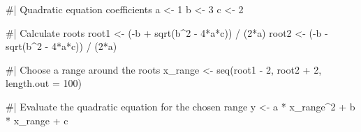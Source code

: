 \documentclass[
  letterpaper,
  DIV=11,
  numbers=noendperiod]{scrartcl}
\newenvironment{Shaded}{\begin{snugshade}}{\end{snugshade}}
\newcommand{\AttributeTok}[1]{\textcolor[rgb]{0.40,0.45,0.13}{#1}}
\newcommand{\CommentTok}[1]{\textcolor[rgb]{0.37,0.37,0.37}{#1}}
\newcommand{\DecValTok}[1]{\textcolor[rgb]{0.68,0.00,0.00}{#1}}
\newcommand{\FunctionTok}[1]{\textcolor[rgb]{0.28,0.35,0.67}{#1}}
\newcommand{\NormalTok}[1]{\textcolor[rgb]{0.00,0.23,0.31}{#1}}
\newcommand{\OtherTok}[1]{\textcolor[rgb]{0.00,0.23,0.31}{#1}}
\newcommand{\SpecialCharTok}[1]{\textcolor[rgb]{0.37,0.37,0.37}{#1}}
\begin{document}
\begin{Shaded}
\begin{Highlighting}[]
\CommentTok{\#| Quadratic equation coefficients}
\NormalTok{a }\OtherTok{\textless{}{-}} \DecValTok{1}
\NormalTok{b }\OtherTok{\textless{}{-}} \DecValTok{3}
\NormalTok{c }\OtherTok{\textless{}{-}} \DecValTok{2}

\CommentTok{\#| Calculate roots}
\NormalTok{root1 }\OtherTok{\textless{}{-}}\NormalTok{ (}\SpecialCharTok{{-}}\NormalTok{b }\SpecialCharTok{+} \FunctionTok{sqrt}\NormalTok{(b}\SpecialCharTok{\^{}}\DecValTok{2} \SpecialCharTok{{-}} \DecValTok{4}\SpecialCharTok{*}\NormalTok{a}\SpecialCharTok{*}\NormalTok{c)) }\SpecialCharTok{/}\NormalTok{ (}\DecValTok{2}\SpecialCharTok{*}\NormalTok{a)}
\NormalTok{root2 }\OtherTok{\textless{}{-}}\NormalTok{ (}\SpecialCharTok{{-}}\NormalTok{b }\SpecialCharTok{{-}} \FunctionTok{sqrt}\NormalTok{(b}\SpecialCharTok{\^{}}\DecValTok{2} \SpecialCharTok{{-}} \DecValTok{4}\SpecialCharTok{*}\NormalTok{a}\SpecialCharTok{*}\NormalTok{c)) }\SpecialCharTok{/}\NormalTok{ (}\DecValTok{2}\SpecialCharTok{*}\NormalTok{a)}

\CommentTok{\#| Choose a range around the roots}
\NormalTok{x\_range }\OtherTok{\textless{}{-}} \FunctionTok{seq}\NormalTok{(root1 }\SpecialCharTok{{-}} \DecValTok{2}\NormalTok{, root2 }\SpecialCharTok{+} \DecValTok{2}\NormalTok{, }\AttributeTok{length.out =} \DecValTok{100}\NormalTok{)}

\CommentTok{\#| Evaluate the quadratic equation for the chosen range}
\NormalTok{y }\OtherTok{\textless{}{-}}\NormalTok{ a }\SpecialCharTok{*}\NormalTok{ x\_range}\SpecialCharTok{\^{}}\DecValTok{2} \SpecialCharTok{+}\NormalTok{ b }\SpecialCharTok{*}\NormalTok{ x\_range }\SpecialCharTok{+}\NormalTok{ c}


\end{Highlighting}
\end{Shaded}
\end{document}
